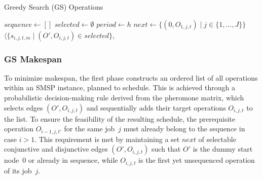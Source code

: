 \begin{algorithm}[t]
\caption{Greedy Search (GS) Operations}
\label{gs-o}
$\mathit{sequence}\leftarrow[]$\;
$\mathit{selected}\leftarrow\emptyset$\;
$\mathit{period}\leftarrow{h}$\;
$\mathit{next}\leftarrow\{(0,O_{1,j,t}) \mid j\in\{1,\dots,J\}\}$\;
\While{$\mathit{next}\neq\emptyset$}{
	\lForEach{$e\in\mathit{next}$}{%
	$p_e\leftarrow \frac{\tau_e}{\sum_{e'\in\mathit{next}}\tau_{e'}}$}
Randomly select an edge $e$ based on $p_e$\;
$\mathit{end time}\leftarrow{e}$\;
\For{selected edge $e=(O',O_{i,j,t})$}{
	$\mathit{e}\leftarrow{start time + process time}$\;
	\If{$\mathit{e}<{period}$}{countinue}
	$\mathit{sequence}.\mathrm{enqueue}(O_{i,j,t})$\;
	$\mathit{selected}\leftarrow\mathit{selected}\cup\{e\}$\;
	$\mathit{next}\leftarrow\{(O_1,O_2)\in\mathit{next} \mid O_2\neq O_{i,j,t}\}$\;
	$\begin{array}{@{}r@{}l@{}}
		E \leftarrow {} &		
		\{(O_{i,j,t},O_{{i+1},j,t'}) \mid i<n_j\}
		\\ {} \cup {} &
		\{(O_{i,j,t},O_{i',j',t}) \mid (O_1,O_{i',j',t})\in\mathit{next}\}\text{\;}
	\end{array}$
	$\mathit{next}\leftarrow\mathit{next}\cup E$\;
}}
\Return $\langle\{s_{i,j,t,m} \mid (O',O_{i,j,t})\in\mathit{selected}\},{}$
\end{algorithm}

\subsubsection{GS Makespan}
To minimize makespan, the first phase constructs an ordered list of all operations within an SMSP instance, planned to schedule. This is achieved through a probabilistic decision-making rule derived from the pheromone matrix, which selects edges $(O',O_{i,j,t})$ and sequentially adds their target operations 
$O_{i,j,t}$ to the list. To ensure the feasibility of the resulting schedule, the prerequisite operation 
$O_{i-1,j,t'}$ for the same job~$j$ must already belong to the sequence in case $i>1$. 
This requirement is met by maintaining a set  $\mathit{next}$
of selectable conjunctive and disjunctive edges $(O',O_{i,j,t})$
such that $O'$ is the dummy start node~$0$ or already in sequence,
while $O_{i,j,t}$ is the first yet unsequenced operation of its job~$j$. 

